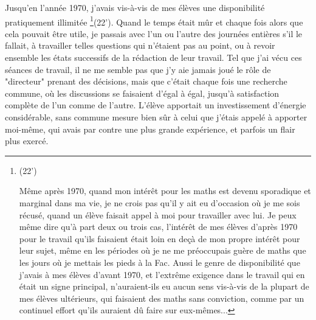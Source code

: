 Jusqu'en l'année 1970, j'avais vis-à-vis de mes élèves une disponibilité pratiquement illimitée \footnote{(22’)\par Même après 1970, quand mon intérêt pour les maths est devenu sporadique et marginal dans ma vie, je ne crois pas qu'il y ait eu d'occasion où je me sois récusé, quand un élève faisait appel à moi pour travailler avec lui. Je peux même dire qu'à part deux ou trois cas, l'intérêt de mes élèves d'après 1970 pour le travail qu'ils faisaient était loin en deçà de mon propre intérêt pour leur sujet, même en les périodes où je ne me préoccupais guère de maths que les jours où je mettais les pieds à la Fac. Aussi le genre de disponibilité que j'avais à mes élèves d'avant 1970, et l'extrême exigence dans le travail qui en était un signe principal, n'auraient-ils eu aucun sens vis-à-vis de la plupart de mes élèves ultérieurs, qui faisaient des maths sans conviction, comme par un continuel effort qu'ils auraient dû faire sur eux-mêmes...}(22’). Quand le temps était mûr et chaque fois alors que cela pouvait être utile, je passais avec l'un ou l'autre des journées entières s'il le fallait, à travailler telles questions qui n'étaient pas au point, ou à revoir ensemble les états successifs de la rédaction de leur travail. Tel que j'ai vécu ces séances de travail, il ne me semble pas que j'y aie jamais joué le rôle de "directeur" prenant des décisions, mais que c'était chaque fois une recherche commune, où les discussions se faisaient d'égal à égal, jusqu'à satisfaction complète de l'un comme de l'autre. L'élève apportait un investissement d'énergie considérable, sans commune mesure bien sûr à celui que j'étais appelé à apporter moi-même, qui avais par contre une plus grande expérience, et parfois un flair plus exercé.

